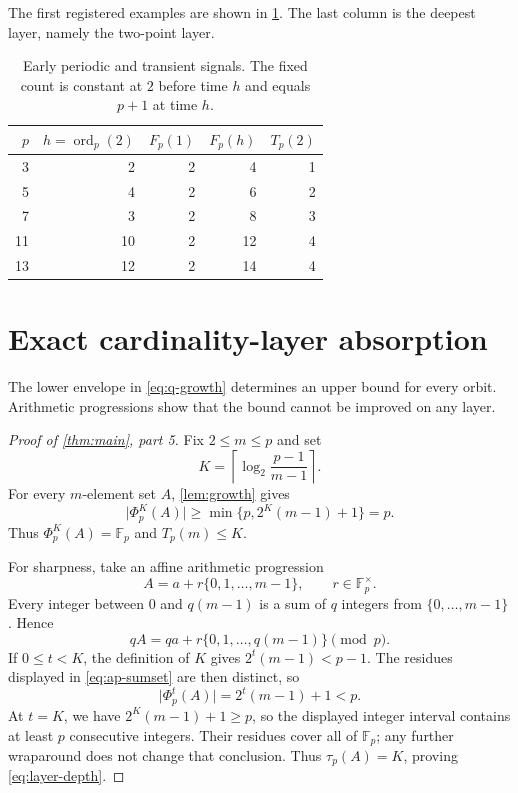 \documentclass[11pt,a4paper]{amsart}
\theoremstyle{definition}
\theoremstyle{remark}
\newcommand{\Fp}{\mathbb F_p}
\newcommand{\ord}{\operatorname{ord}}
\newcommand{\card}[1]{\lvert #1\rvert}
\begin{document}
The first registered examples are shown in \cref{tab:examples}.  The last
column is the deepest layer, namely the two-point layer.
\begin{table}[ht]
\centering
\caption{Early periodic and transient signals.  The fixed count is constant
at $2$ before time $h$ and equals $p+1$ at time $h$.}
\label{tab:examples}
\begin{tabular}{rrrrr}
\toprule
$p$ & $h=\ord_p(2)$ & $F_p(1)$ & $F_p(h)$ & $T_p(2)$\\
\midrule
3  & 2  & 2 & 4  & 1\\
5  & 4  & 2 & 6  & 2\\
7  & 3  & 2 & 8  & 3\\
11 & 10 & 2 & 12 & 4\\
13 & 12 & 2 & 14 & 4\\
\bottomrule
\end{tabular}
\end{table}

\section{Exact cardinality-layer absorption}\label{sec:depth}

The lower envelope in \eqref{eq:q-growth} determines an upper bound for
every orbit.  Arithmetic progressions show that the bound cannot be
improved on any layer.

\begin{proof}[Proof of \cref{thm:main}, part 5]
Fix $2\leq m\leq p$ and set
\[
 K=\left\lceil\log_2\frac{p-1}{m-1}\right\rceil.
\]
For every $m$-element set $A$, \cref{lem:growth} gives
\[
 \card{\Phi_p^K(A)}
 \geq\min\{p,2^K(m-1)+1\}=p.
\]
Thus $\Phi_p^K(A)=\Fp$ and $T_p(m)\leq K$.

For sharpness, take an affine arithmetic progression
\[
 A=a+r\{0,1,\ldots,m-1\},\qquad r\in\Fp^\times.
\]
Every integer between $0$ and $q(m-1)$ is a sum of $q$ integers from
$\{0,\ldots,m-1\}$.  Hence
\begin{equation}\label{eq:ap-sumset}
 qA=qa+r\{0,1,\ldots,q(m-1)\}\pmod p.
\end{equation}
If $0\leq t<K$, the definition of $K$ gives
$2^t(m-1)<p-1$.  The residues displayed in \eqref{eq:ap-sumset} are then
distinct, so
\[
 \card{\Phi_p^t(A)}=2^t(m-1)+1<p.
\]
At $t=K$, we have $2^K(m-1)+1\geq p$, so the displayed integer interval
contains at least $p$ consecutive integers.  Their residues cover all of
$\Fp$; any further wraparound does not change that conclusion.  Thus
$\tau_p(A)=K$, proving \eqref{eq:layer-depth}.
\end{proof}
\end{document}

